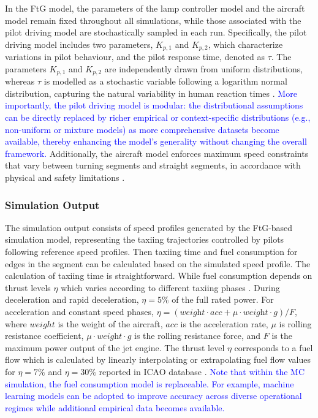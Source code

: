 \documentclass{article}
\newcommand*{\blue}{\textcolor{blue}}
\begin{document}
In the FtG model, the parameters of the lamp controller model and the aircraft model remain fixed throughout all simulations, while those associated with the pilot driving model are stochastically sampled in each run. Specifically, the pilot driving model includes two parameters, $K_{p,1}$ and $K_{p,2}$, which characterize variations in pilot behaviour, and the pilot response time, denoted as $\tau$. The parameters $K_{p,1}$ and $K_{p,2}$ are independently drawn from uniform distributions, whereas $\tau$ is modelled as a stochastic variable following a logarithm normal distribution, capturing the natural variability in human reaction times \cite{zhang2020feasibility}. \blue{More importantly, the pilot driving model is modular: the distributional assumptions can be directly replaced by richer empirical or context-specific distributions (e.g., non-uniform or mixture models) as more comprehensive datasets become available, thereby enhancing the model’s generality without changing the overall framework.} Additionally, the aircraft model enforces maximum speed constraints that vary between turning segments and straight segments, in accordance with physical and safety limitations \cite{weiszer2020multi}.

\subsubsection{Simulation Output}

The simulation output consists of speed profiles generated by the FtG-based simulation model, representing the taxiing trajectories controlled by pilots following reference speed profiles. Then taxiing time and fuel consumption for edges in the segment can be calculated based on the simulated speed profile. The calculation of taxiing time is straightforward. While fuel consumption depends on thrust levels $\eta$ which varies according to different taxiing phases \cite{chen2016toward}. During deceleration and rapid deceleration, $\eta = 5\%$ of the full rated power. For acceleration and constant speed phases, $\eta = (\textit{weight} \cdot \textit{acc} + \mu \cdot \textit{weight} \cdot g) / F$, where $weight$ is the weight of the aircraft, $acc$ is the acceleration rate, $\mu$ is rolling resistance coefficient, $\mu \cdot \textit{weight} \cdot \textit{g}$ is the rolling resistance force, and $F$ is the maximum power output of the jet engine. The thrust level $\eta$ corresponds to a fuel flow which is calculated by linearly interpolating or extrapolating fuel flow values for $\eta = 7\%$ and $\eta = 30\%$ reported in ICAO database \cite{nikoleris2011detailed}. \blue{Note that within the MC simulation, the fuel consumption model is replaceable. For example, machine learning models can be adopted to improve accuracy across diverse operational regimes while additional empirical data becomes available.}
\end{document}
